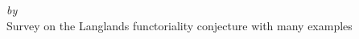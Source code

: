 \begin{titlepage}
  \vspace*{5cm}
  \makeatletter
  \begin{center}
    \begin{Huge}
      \@title
    \end{Huge}\\[0.1cm]
    \begin{Large}
      \@subtitle
    \end{Large}\\
    \emph{by}\\
    \@author
    \vfill
    Survey on the Langlands functoriality conjecture with many examples
  \end{center}
  \makeatother
\end{titlepage}

\newpage
\null
\thispagestyle{empty}
\newpage

